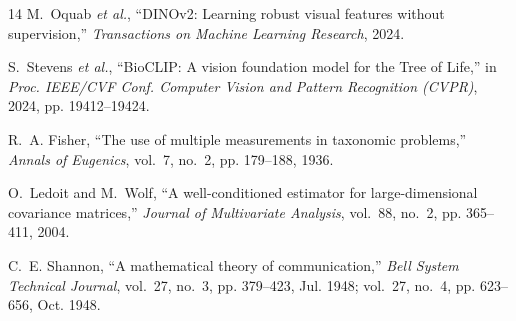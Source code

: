 \documentclass[conference]{IEEEtran}
\begin{document}
\begin{thebibliography}{14}
M.~Oquab \emph{et al.}, ``DINOv2: Learning robust visual features without supervision,'' \emph{Transactions on Machine Learning Research}, 2024.

S.~Stevens \emph{et al.}, ``BioCLIP: A vision foundation model for the Tree of Life,'' in \emph{Proc. IEEE/CVF Conf. Computer Vision and Pattern Recognition (CVPR)}, 2024, pp. 19412--19424.

R.~A. Fisher, ``The use of multiple measurements in taxonomic problems,'' \emph{Annals of Eugenics}, vol.~7, no.~2, pp. 179--188, 1936.

O.~Ledoit and M.~Wolf, ``A well-conditioned estimator for large-dimensional covariance matrices,'' \emph{Journal of Multivariate Analysis}, vol.~88, no.~2, pp. 365--411, 2004.

C.~E. Shannon, ``A mathematical theory of communication,'' \emph{Bell System Technical Journal}, vol.~27, no.~3, pp. 379--423, Jul. 1948; vol.~27, no.~4, pp. 623--656, Oct. 1948.

\end{thebibliography}
\end{document}
